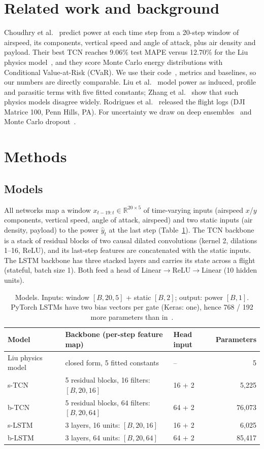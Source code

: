 \documentclass{article}
\begin{document}
\section{Related work and background}
Choudhry et al.~\cite{choudhry2021} predict power at each time step from a 20-step window of airspeed, its
components, vertical speed and angle of attack, plus air density and payload. Their best TCN reaches 9.06\% test
MAPE versus 12.70\% for the Liu physics model~\cite{liu2017}, and they score Monte Carlo energy distributions with
Conditional Value-at-Risk (CVaR). We use their code~\cite{cvarcode}, metrics and baselines, so our numbers are
directly comparable. Liu et al.~\cite{liu2017} model power as induced, profile and parasitic terms with five fitted
constants; Zhang et al.~\cite{zhang2021} show that such physics models disagree widely. Rodrigues et
al.~\cite{rodrigues2021} released the flight logs (DJI Matrice 100, Penn Hills, PA). For uncertainty we draw on
deep ensembles~\cite{lakshminarayanan2017} and Monte Carlo dropout~\cite{gal2016}.

\section{Methods}
\subsection{Models}
All networks map a window $x_{t-19:t}\in\mathbb{R}^{20\times5}$ of time-varying inputs (airspeed $x$/$y$
components, vertical speed, angle of attack, airspeed) and two static inputs (air density, payload) to the power
$\hat y_t$ at the last step (Table~\ref{tab:models}). The TCN backbone is a stack of residual blocks of two causal
dilated convolutions (kernel 2, dilations 1--16, ReLU), and its last-step features are concatenated with the
static inputs. The LSTM backbone has three stacked layers and carries its state across a flight (stateful,
batch size 1). Both feed a head of Linear$\to$ReLU$\to$Linear (10 hidden units).

\begin{table}[ht]
\centering
\caption{Models. Inputs: window $[B,20,5]$ + static $[B,2]$; output: power $[B,1]$. PyTorch LSTMs have two
bias vectors per gate (Keras: one), hence 768 / 192 more parameters than in~\cite{choudhry2021}.}
\label{tab:models}
\small
\begin{tabular}{lllr}
\toprule
Model & Backbone (per-step feature map) & Head input & Parameters \\
\midrule
Liu physics model~\cite{liu2017} & closed form, 5 fitted constants & -- & 5 \\
s-TCN & 5 residual blocks, 16 filters: $[B,20,16]$ & 16 + 2 & 5,225 \\
b-TCN & 5 residual blocks, 64 filters: $[B,20,64]$ & 64 + 2 & 76,073 \\
s-LSTM & 3 layers, 16 units: $[B,20,16]$ & 16 + 2 & 6,025 \\
b-LSTM & 3 layers, 64 units: $[B,20,64]$ & 64 + 2 & 85,417 \\
\bottomrule
\end{tabular}
\end{table}
\end{document}

